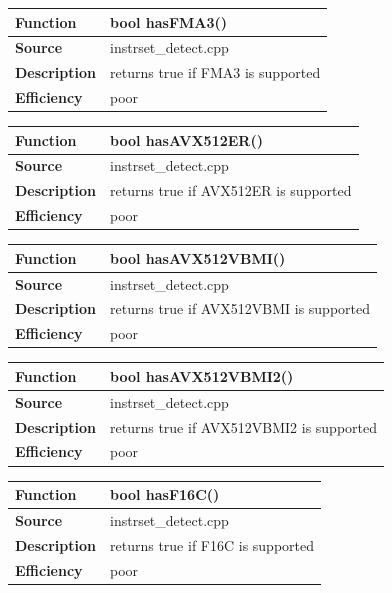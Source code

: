 \documentclass[vcl_manual.tex]{subfiles}
\begin{document}
\begin{tabular}{|p{25mm}|p{100mm}|}
\hline
\bfseries Function & bool hasFMA3() \\ \hline
\bfseries Source & instrset\_detect.cpp \\ \hline
\bfseries Description & returns true if FMA3 is supported \\ \hline
 \bfseries Efficiency & poor \\ \hline
\end{tabular}

\begin{tabular}{|p{25mm}|p{100mm}|}
\hline
\bfseries Function & bool hasAVX512ER() \\ \hline
\bfseries Source & instrset\_detect.cpp \\ \hline
\bfseries Description & returns true if AVX512ER is supported \\ \hline
 \bfseries Efficiency & poor \\ \hline
\end{tabular}

\begin{tabular}{|p{25mm}|p{100mm}|}
\hline
\bfseries Function & bool hasAVX512VBMI() \\ \hline
\bfseries Source & instrset\_detect.cpp \\ \hline
\bfseries Description & returns true if AVX512VBMI is supported \\ \hline
 \bfseries Efficiency & poor \\ \hline
\end{tabular}

\begin{tabular}{|p{25mm}|p{100mm}|}
\hline
\bfseries Function & bool hasAVX512VBMI2() \\ \hline
\bfseries Source & instrset\_detect.cpp \\ \hline
\bfseries Description & returns true if AVX512VBMI2 is supported \\ \hline
 \bfseries Efficiency & poor \\ \hline
\end{tabular}

\begin{tabular}{|p{25mm}|p{100mm}|}
\hline
\bfseries Function & bool hasF16C() \\ \hline
\bfseries Source & instrset\_detect.cpp \\ \hline
\bfseries Description & returns true if F16C is supported \\ \hline
 \bfseries Efficiency & poor \\ \hline
\end{tabular}
\end{document}
